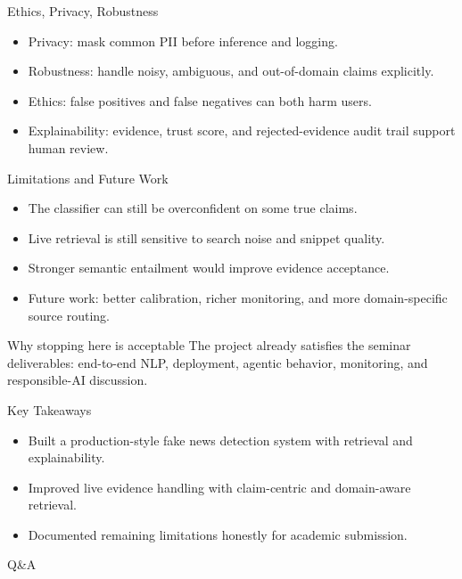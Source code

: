 \documentclass[aspectratio=169]{beamer}
\begin{document}
\begin{frame}{Ethics, Privacy, Robustness}
  \begin{itemize}
    \item Privacy: mask common PII before inference and logging.
    \item Robustness: handle noisy, ambiguous, and out-of-domain claims explicitly.
    \item Ethics: false positives and false negatives can both harm users.
    \item Explainability: evidence, trust score, and rejected-evidence audit trail support human review.
  \end{itemize}
\end{frame}

\begin{frame}{Limitations and Future Work}
  \begin{itemize}
    \item The classifier can still be overconfident on some true claims.
    \item Live retrieval is still sensitive to search noise and snippet quality.
    \item Stronger semantic entailment would improve evidence acceptance.
    \item Future work: better calibration, richer monitoring, and more domain-specific source routing.
  \end{itemize}
  \begin{block}{Why stopping here is acceptable}
    The project already satisfies the seminar deliverables: end-to-end NLP, deployment, agentic behavior, monitoring, and responsible-AI discussion.
  \end{block}
\end{frame}

\begin{frame}{Key Takeaways}
  \begin{itemize}
    \item Built a production-style fake news detection system with retrieval and explainability.
    \item Improved live evidence handling with claim-centric and domain-aware retrieval.
    \item Documented remaining limitations honestly for academic submission.
  \end{itemize}
  \vspace{0.5em}
  \centering
  \Large Q\&A
\end{frame}
\end{document}
